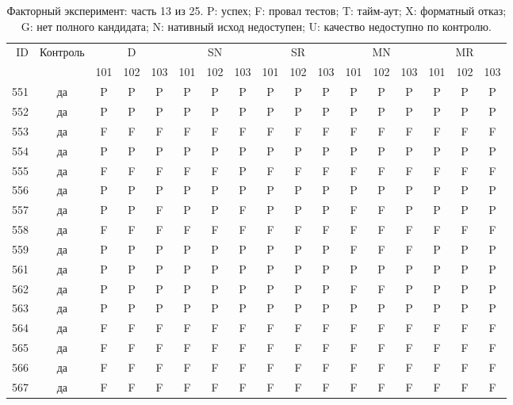 \begin{table}[p]\centering\footnotesize
\setlength{\tabcolsep}{3pt}
\caption{Факторный эксперимент: часть 13 из 25. P: успех; F: провал тестов; T: тайм-аут; X: форматный отказ; G: нет полного кандидата; N: нативный исход недоступен; U: качество недоступно по контролю.}
\begin{tabular*}{\textwidth}{@{\extracolsep{\fill}}rcccccccccccccccc}\toprule
ID & Контроль & \multicolumn{3}{c}{D} & \multicolumn{3}{c}{SN} & \multicolumn{3}{c}{SR} & \multicolumn{3}{c}{MN} & \multicolumn{3}{c}{MR}\\
\cmidrule(lr){3-5}\cmidrule(lr){6-8}\cmidrule(lr){9-11}\cmidrule(lr){12-14}\cmidrule(lr){15-17}
 & & 101 & 102 & 103 & 101 & 102 & 103 & 101 & 102 & 103 & 101 & 102 & 103 & 101 & 102 & 103\\\midrule
551 & да & P & P & P & P & P & P & P & P & P & P & P & P & P & P & P\\
552 & да & P & P & P & P & P & P & P & P & P & P & P & P & P & P & P\\
553 & да & F & F & F & F & F & F & F & F & F & F & F & F & F & F & F\\
554 & да & P & P & P & P & P & P & P & P & P & P & P & P & P & P & P\\
555 & да & F & F & F & F & F & P & F & F & F & F & F & F & F & F & F\\
556 & да & P & P & P & P & P & P & P & P & P & P & P & P & P & P & P\\
557 & да & P & P & F & P & P & F & P & P & P & F & F & P & P & P & P\\
558 & да & F & F & F & F & F & F & F & F & F & F & F & F & F & F & F\\
559 & да & P & P & P & P & P & P & P & P & P & F & F & F & P & P & P\\
561 & да & P & P & P & P & P & P & P & P & P & P & P & P & P & P & P\\
562 & да & P & P & P & P & P & P & P & P & P & F & F & P & P & P & P\\
563 & да & P & P & P & P & P & P & P & P & P & P & P & P & P & P & P\\
564 & да & F & F & F & F & F & F & F & F & F & F & F & F & F & F & F\\
565 & да & F & F & F & F & F & F & F & F & F & F & F & F & F & F & F\\
566 & да & F & F & F & F & F & F & F & F & F & F & F & F & F & F & F\\
567 & да & F & F & F & F & F & F & F & F & F & F & F & F & F & F & F\\

\end{tabular*}
\end{table}
